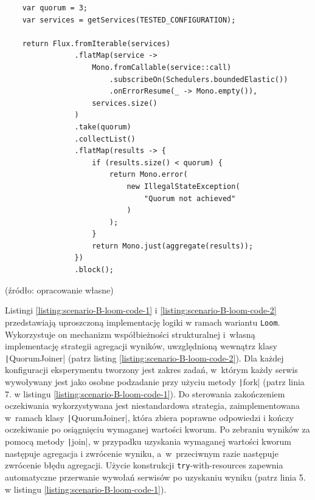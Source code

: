 \newpage
\begin{listing}[!ht]
    \begin{verbatim}
    var quorum = 3;
    var services = getServices(TESTED_CONFIGURATION);

    return Flux.fromIterable(services)
                .flatMap(service -> 
                    Mono.fromCallable(service::call)
                        .subscribeOn(Schedulers.boundedElastic())
                        .onErrorResume(_ -> Mono.empty()),
                    services.size()
                )
                .take(quorum)
                .collectList()
                .flatMap(results -> {
                    if (results.size() < quorum) {
                        return Mono.error(
                            new IllegalStateException(
                                "Quorum not achieved"
                            )
                        );
                    }
                    return Mono.just(aggregate(results));
                })
                .block();
    \end{verbatim}
    \caption{Uproszczona implementacja agregacji wyników w~oparciu o~mechanizm kworum w~ramach scenariusza $\mathcal{B}$ w~wariancie \texttt{Reactive}}
    \label{listing:scenario-B-reactive-code}
\end{listing}

\vspace{-20pt}
\begin{center}
    \small{(źródło: opracowanie własne)}
\end{center}

Listingi \ref{listing:scenario-B-loom-code-1} i \ref{listing:scenario-B-loom-code-2} przedstawiają uproszczoną implementację logiki w ramach wariantu \texttt{Loom}. Wykorzystuje on mechanizm współbieżności strukturalnej i~własną implementację strategii agregacji wyników, uwzględnioną wewnątrz klasy \texttt|QuorumJoiner| (patrz listing \ref{listing:scenario-B-loom-code-2}).
Dla każdej konfiguracji eksperymentu tworzony jest zakres zadań, w~którym każdy serwis wywoływany jest jako osobne podzadanie przy użyciu metody \texttt|fork| (patrz linia 7. w listingu \ref{listing:scenario-B-loom-code-1}).
Do sterowania zakończeniem oczekiwania wykorzystywana jest niestandardowa strategia, zaimplementowana w~ramach klasy \texttt|QuorumJoiner|, która zbiera poprawne odpowiedzi i kończy oczekiwanie po osiągnięciu wymaganej wartości kworum.
Po zebraniu wyników za pomocą metody \texttt|join|, w przypadku uzyskania wymaganej wartości kworum następuje agregacja i zwrócenie wyniku, a~w~przeciwnym razie następuje zwrócenie błędu agregacji.
Użycie konstrukcji \texttt{try}-with-resources zapewnia automatyczne przerwanie wywołań serwisów po uzyskaniu wyniku (patrz linia 5. w listingu \ref{listing:scenario-B-loom-code-1}).

